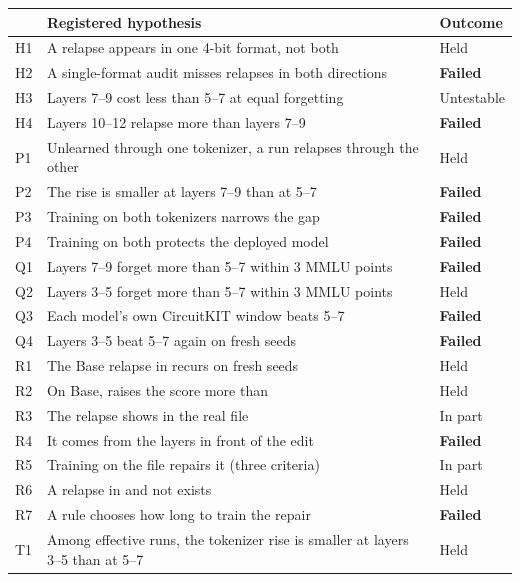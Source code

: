 \begin{table}[!t]
\centering\footnotesize\setlength{\tabcolsep}{3pt}
\begin{tabular}{@{}l>{\raggedright\arraybackslash}p{}l@{}}
\toprule
 & Registered hypothesis & Outcome \\
\midrule
H1 & A relapse appears in one 4-bit format, not both & Held \\
H2 & A single-format audit misses relapses in both directions & \textbf{Failed} \\
H3 & Layers 7--9 cost less than 5--7 at equal forgetting & Untestable \\
H4 & Layers 10--12 relapse more than layers 7--9 & \textbf{Failed} \\
\addlinespace[2pt]
P1 & Unlearned through one tokenizer, a run relapses through the other & Held \\
P2 & The rise is smaller at layers 7--9 than at 5--7 & \textbf{Failed} \\
P3 & Training on both tokenizers narrows the gap & \textbf{Failed} \\
P4 & Training on both protects the deployed model & \textbf{Failed} \\
\addlinespace[2pt]
Q1 & Layers 7--9 forget more than 5--7 within 3 MMLU points & \textbf{Failed} \\
Q2 & Layers 3--5 forget more than 5--7 within 3 MMLU points & Held \\
Q3 & Each model's own CircuitKIT window beats 5--7 & \textbf{Failed} \\
Q4 & Layers 3--5 beat 5--7 again on fresh seeds & \textbf{Failed} \\
\addlinespace[2pt]
R1 & The Base relapse in \fq{} recurs on fresh seeds & Held \\
R2 & On Base, \fq{} raises the score more than \nf{} & Held \\
R3 & The relapse shows in the real \fq{} file & In part \\
R4 & It comes from the layers in front of the edit & \textbf{Failed} \\
R5 & Training on the file repairs it (three criteria) & In part \\
R6 & A relapse in \nf{} and not \fq{} exists & Held \\
R7 & A rule chooses how long to train the repair & \textbf{Failed} \\
\addlinespace[2pt]
T1 & Among effective runs, the tokenizer rise is smaller at layers 3--5 than at 5--7 & Held \\

\end{tabular}
\end{table}
